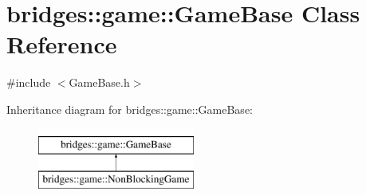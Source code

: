 \hypertarget{classbridges_1_1game_1_1_game_base}{}\section{bridges\+:\+:game\+:\+:Game\+Base Class Reference}
\label{classbridges_1_1game_1_1_game_base}


{\ttfamily \#include $<$Game\+Base.\+h$>$}

Inheritance diagram for bridges\+:\+:game\+:\+:Game\+Base\+:\begin{figure}[H]
\begin{center}
\leavevmode
\includegraphics[height=2.000000cm]{classbridges_1_1game_1_1_game_base}
\end{center}
\end{figure}
